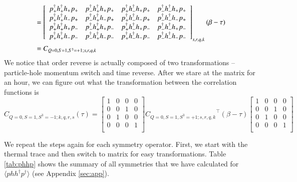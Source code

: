 \begin{equation}
  \begin{aligned}
    &= \left[ 
    \begin{array}{cccc}
      \dcor{+}{+}{+}{+} & \dcor{+}{+}{+}{-} & \dcor{+}{+}{-}{+} & \dcor{+}{+}{-}{-} \\
      \dcor{+}{-}{+}{+} & \dcor{+}{-}{+}{-} & \dcor{+}{-}{-}{+} & \dcor{+}{-}{-}{-} \\
      \dcor{-}{+}{+}{+} & \dcor{-}{+}{+}{-} & \dcor{-}{+}{-}{+} & \dcor{-}{+}{-}{-} \\
      \dcor{-}{-}{+}{+} & \dcor{-}{-}{+}{-} & \dcor{-}{-}{-}{+} & \dcor{-}{-}{-}{-} \\
    \end{array} \right]_{s,r,q,k} (\beta-\tau) \\
    &= C_{Q=0,S=1,S^3=+1;s,r,q,k}
  \end{aligned}
\end{equation}
We notice that order reverse is actually composed of two transformations -- particle-hole momentum switch and time reverse. After we stare at the matrix for an hour, we can figure out what the transformation between the correlation functions is
\begin{equation}
  C_{Q=0,S=1,S^3=-1;k,q,r,s} (\tau) =
  \left[ {\begin{array}{cccc}
    1 & 0 & 0 & 0 \\
    0 & 0 & 1 & 0 \\
    0 & 1 & 0 & 0 \\
    0 & 0 & 0 & 1 \\
  \end{array} } \right]
  {C_{Q=0,S=1,S^3=+1;s,r,q,k}}^\top (\beta-\tau)
  \left[ {\begin{array}{cccc}
    1 & 0 & 0 & 0 \\
    0 & 0 & 1 & 0 \\
    0 & 1 & 0 & 0 \\
    0 & 0 & 0 & 1 \\
  \end{array} } \right]
\end{equation}

We repeat the steps again for each symmetry operator. First, we start with the thermal trace and then switch to matrix for easy transformations. Table \ref{tab:phhp} shows the summary of all symmetries that we have calculated for $\langle phh^\dagger p^\dagger \rangle$ (see Appendix \ref{sec:app}).

